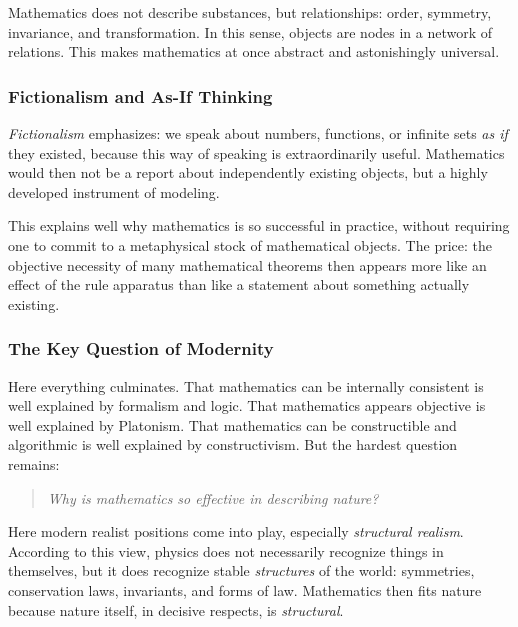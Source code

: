 \begin{NoteBox}
	\label{box:structuralist-core}
	\small
	Mathematics does not describe substances,
	but relationships:
	order,
	symmetry,
	invariance,
	and transformation.
	In this sense, objects are nodes
	in a network of relations.
	This makes mathematics at once abstract
	and astonishingly universal.
\end{NoteBox}

\subsubsection*{Fictionalism and As-If Thinking}

\emph{Fictionalism} emphasizes:
we speak about numbers,
functions, or infinite sets
\emph{as if} they existed,
because this way of speaking is extraordinarily useful.
Mathematics would then not be a report
about independently existing objects,
but a highly developed instrument of modeling.

This explains well
why mathematics is so successful in practice,
without requiring one to commit
to a metaphysical stock of mathematical objects.
The price:
the objective necessity of many mathematical theorems then appears more like an effect of the rule apparatus
than like a statement about something actually existing.

\subsubsection*{The Key Question of Modernity}

Here everything culminates.
That mathematics can be internally consistent
is well explained by formalism and logic.
That mathematics appears objective
is well explained by Platonism.
That mathematics can be constructible and algorithmic
is well explained by constructivism.
But the hardest question remains:

\medskip
\begin{quote}
	\emph{Why is mathematics so effective in describing nature?}
\end{quote}
\medskip

Here modern realist positions come into play,
especially \emph{structural realism}.
According to this view, physics does not necessarily recognize things in themselves,
but it does recognize stable \emph{structures} of the world:
symmetries,
conservation laws,
invariants,
and forms of law.
Mathematics then fits nature
because nature itself, in decisive respects, is \emph{structural}.

